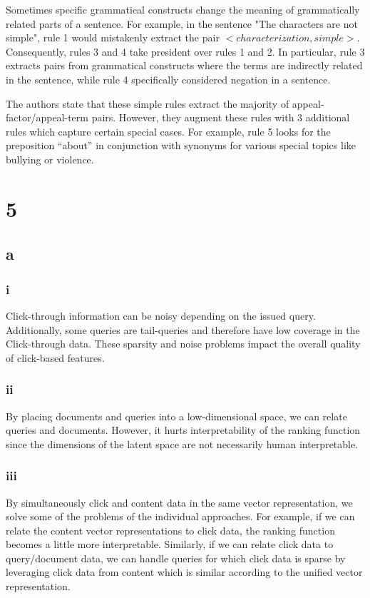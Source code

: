 \documentclass[paper=a4, fontsize=11pt]{scrartcl}
\begin{document}
Sometimes specific grammatical constructs change the meaning of grammatically
related parts of a sentence.
For example, in the sentence "The characters are not simple", rule 1 would
mistakenly extract the pair $<characterization, simple>$. Consequently, rules
3 and 4 take president over rules 1 and 2.
In particular, rule 3 extracts pairs from grammatical constructs where the
terms are indirectly related in the sentence,
while rule 4 specifically considered negation in a sentence.

The authors state that these simple rules extract the majority of
appeal-factor/appeal-term pairs.
However, they augment these rules with 3 additional rules which capture
certain special cases.
For example, rule 5 looks for the preposition ``about'' in conjunction with
synonyms for various special topics like bullying or violence.

\section*{5}

\subsection*{a}

\subsubsection*{i}

Click-through information can be noisy depending on the issued query.
Additionally, some queries are tail-queries and therefore have low coverage in
the Click-through data.
These sparsity and noise problems impact the overall quality of click-based
features.

\subsubsection*{ii}

By placing documents and queries into a low-dimensional space, we can relate
queries and documents. However, it hurts interpretability of the ranking
function since the dimensions of the latent space are not necessarily human
interpretable.

\subsubsection*{iii}

By simultaneously click and content data in the same vector representation, we
solve some of the problems of the individual approaches. For example, if we
can relate the content vector representations to click data, the ranking
function becomes a little more interpretable. Similarly, if we can relate
click data to query/document data, we can handle queries for which click data
is sparse by leveraging click data from content which is similar according to
the unified vector representation.
\end{document}

